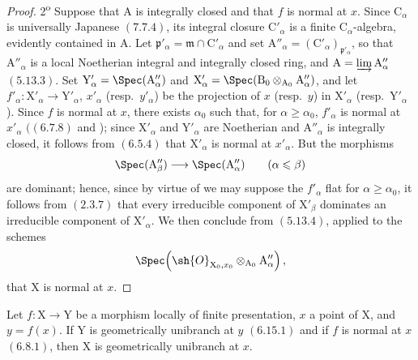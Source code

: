 \begin{proof}
2\textsuperscript{o} Suppose that $\mathrm{A}$ is integrally closed and that $f$ is normal at $x$. Since $\mathrm{C}_\alpha$ is universally Japanese $(7.7.4)$, its integral closure $\mathrm{C}'_\alpha$ is a finite $\mathrm{C}_\alpha$-algebra, evidently contained in $\mathrm{A}$. Let $\mathfrak{p}'_\alpha=\mathfrak{m}\cap\mathrm{C}'_\alpha$ and set $\mathrm{A}''_\alpha=(\mathrm{C}'_\alpha)_{\mathfrak{p}'_\alpha}$, so that $\mathrm{A}''_\alpha$ is a local Noetherian integral and integrally closed ring, and $\mathrm{A}=\varinjlim\mathrm{A}''_\alpha$ $(5.13.3)$. Set $\mathrm{Y}'_\alpha=\Spec(\mathrm{A}''_\alpha)$ and $\mathrm{X}'_\alpha=\Spec(\mathrm{B}_0\otimes_{\mathrm{A}_0}\mathrm{A}''_\alpha)$, and let $f'_\alpha:\mathrm{X}'_\alpha\to\mathrm{Y}'_\alpha$, $x'_\alpha$ (resp.\ $y'_\alpha$) be the projection of $x$ (resp.\ $y$) in $\mathrm{X}'_\alpha$ (resp.\ $\mathrm{Y}'_\alpha$). Since $f$ is normal at $x$, there exists $\alpha_0$ such that, for $\alpha\geqslant\alpha_0$, $f'_\alpha$ is normal at $x'_\alpha$ $((6.7.8)$ and );  since $\mathrm{X}'_\alpha$ and $\mathrm{Y}'_\alpha$ are Noetherian and $\mathrm{A}''_\alpha$ is integrally closed, it follows from $(6.5.4)$ that $\mathrm{X}'_\alpha$ is normal at $x'_\alpha$. But the morphisms
\[
  \Spec(\mathrm{A}''_\beta)\longrightarrow\Spec(\mathrm{A}''_\alpha)
  \qquad(\alpha\leqslant\beta)
\]
are dominant; hence, since by virtue of  we may suppose the $f'_\alpha$ flat for $\alpha\geqslant\alpha_0$, it follows from $(2.3.7)$ that every irreducible component of $\mathrm{X}'_\beta$ dominates an irreducible component of $\mathrm{X}'_\alpha$. We then conclude from $(5.13.4)$, applied to the schemes
\[
  \Spec\!\left(\sh{O}_{\mathrm{X}_0,x_0}\otimes_{\mathrm{A}_0}\mathrm{A}''_\alpha\right),
\]
that $\mathrm{X}$ is normal at $x$.
\end{proof}

\begin{corollary}[11.3.14]
\label{IV.11.3.14}
Let $f:\mathrm{X}\to\mathrm{Y}$ be a morphism locally of finite presentation, $x$ a point of $\mathrm{X}$, and $y=f(x)$. If $\mathrm{Y}$ is geometrically unibranch at $y$ $(6.15.1)$ and if $f$ is normal at $x$ $(6.8.1)$, then $\mathrm{X}$ is geometrically unibranch at $x$.
\end{corollary}


